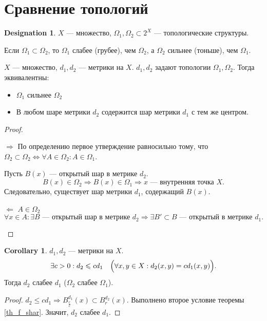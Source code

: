 \documentclass[11pt]{book}
\renewcommand{\le}{\leqslant}
\theoremstyle{definition}
\theoremstyle{plain}
\theoremstyle{plain}
\theoremstyle{definition}
\newtheorem*{cor}{Corollary}
\newtheorem*{name}{Designation}
\theoremstyle{remark}
\begin{document}
\section{Сравнение топологий}
\begin{name}
    $ X$ --- множество,  $ \Omega _1, \Omega _2 \subset 2^{X}$ --- топологические структуры.
\end{name}
\begin{defn}
    Если $ \Omega _1 \subset \Omega _2$, то $ \Omega _1$ слабее (грубее), чем $ \Omega _2$, а $ \Omega _2$ сильнее (тоньше), чем $ \Omega _1$.
\end{defn}
\begin{thm}\label{th_f_shar}
    $ X$ --- множество,  $ d_1, d_2$ --- метрики на $ X$.  $ d_1, d_2$ задают топологии $ \Omega _1, \Omega _2$.
    Тогда эквивалентны:
    \begin{itemize}
	\item $ \Omega _1$ сильнее $ \Omega _2$
	\item В любом шаре метрики $ d_2$ содержится шар метрики $ d_1$ с тем же центром.
    \end{itemize}
\end{thm}
\begin{proof}
    $ $
    \begin{description}
	\item $ \boxed{ \Longrightarrow }$ По определению  первое утверждение равносильно тому, что $ \Omega _2 \subset \Omega _2 \Longleftrightarrow \forall A \in \Omega _2: A \in \Omega _1$.

	    Пусть $ B(x)$ --- открытый шар в метрике  $ d_2$.
	    \[
		B(x) \in \Omega _2 \Longrightarrow B(x) \in \Omega _1 \Longrightarrow x \text{ --- внутренняя точка } X
	    .\]
	    Следовательно, существует шар метрики $ d_1$, содержащий $ B(x)$.
	\item $ \boxed{ \Longleftarrow  }$
	    $ A \in \Omega _2$
	    \[
		\forall x \in A : \exists B \text{ --- открытый шар в метрике } d_2 \Longrightarrow \exists B' \subset B \text{ --- открытый в метрике } d_1
	    .\]
    \end{description}
\end{proof}
\begin{cor}
    $ d_1, d_2$ --- метрики на $ X$.
    \[
	\exists c >0 : d_2 \le cd_1 \quad \Bigl( \forall x, y \in  X: d_2(x, y) = c d_1(x, y)\Bigr)
    .\]
    Тогда $ d_2$ слабее $ d_1$ ($ \Omega _2$ слабее $ \Omega _1$).
\end{cor}
\begin{proof}
    $ d_2 \le cd_1 \Longrightarrow B_{\frac{r}{c}}^{d_1}(x) \subset B_r^{d_2}(x) $. Выполнено второе условие теоремы \ref{th_f_shar}. Значит,  $ d_2 $ слабее $ d_1$.
\end{proof}
\end{document}
